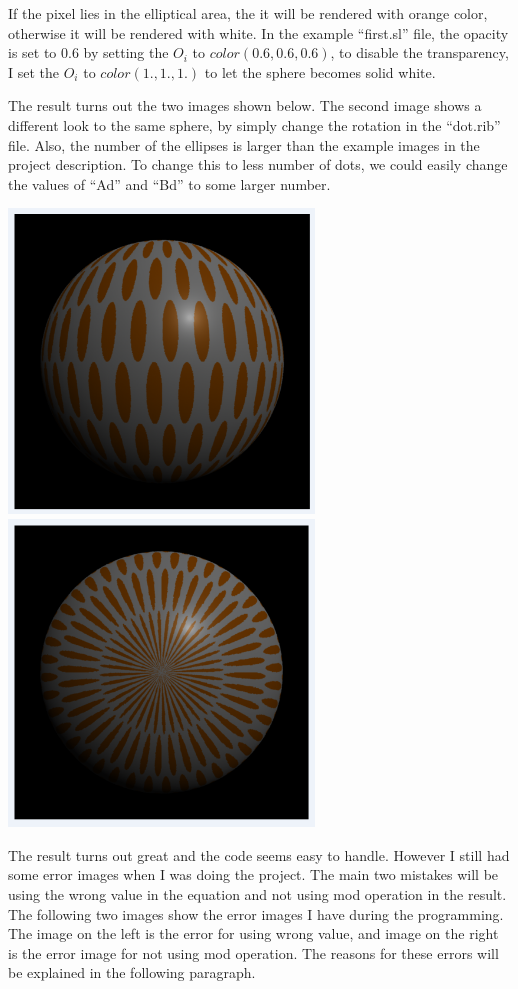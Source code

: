 \documentclass[letterpaper,14pt,titlepage,fleqn]{article}
\begin{document}
If the pixel lies in the elliptical area, the it will be rendered with orange color, otherwise it will be rendered with white. In the example ``first.sl'' file, the opacity is set to 0.6 by setting the $O_i$ to $color(0.6, 0.6, 0.6)$, to disable the transparency, I set the $O_i$ to $color(1., 1., 1.)$ to let the sphere becomes solid white.

The result turns out the two images shown below. The second image shows a different look to the same sphere, by simply change the rotation in the ``dot.rib'' file. Also, the number of the ellipses is larger than the example images in the project description. To change this to less number of dots, we could easily change the values of ``Ad'' and ``Bd'' to some larger number.

\includegraphics[width=3.2in]{1}
\includegraphics[width=3.2in]{4}

The result turns out great and the code seems easy to handle. However I still had some error images when I was doing the project. The main two mistakes will be using the wrong value in the equation and not using mod operation in the result. The following two images show the error images I have during the programming. The image on the left is the error for using wrong value, and image on the right is the error image for not using mod operation. The reasons for these errors will be explained in the following paragraph.
\end{document}
